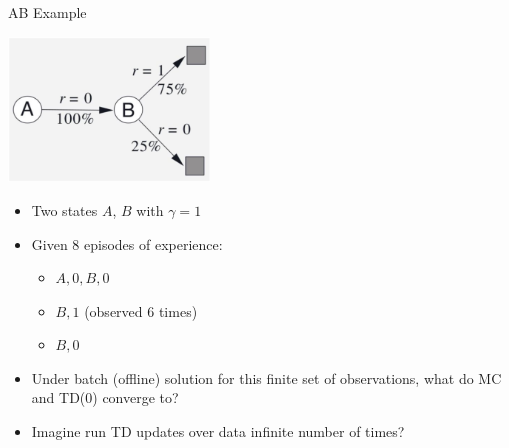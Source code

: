 \documentclass[aspectratio=169]{../latex_main/tntbeamer}  %
\begin{document}
\begin{frame}[c]{AB Example }
	
	\centering
	\includegraphics[width=0.4\textwidth]{images/ab_example.png}
	
	\begin{itemize}
		\item Two states $A$, $B$ with $\gamma = 1$
		\item Given $8$ episodes of experience:
		\begin{itemize}
			\item $A, 0, B, 0$
			\item $B, 1$ (observed $6$ times)
			\item $B, 0$ 
		\end{itemize}
		\item Under batch (offline) solution for this finite set of observations, what do MC and TD(0) converge to?
		\item Imagine run TD updates over data infinite number of times?
	\end{itemize}
	
\end{frame}
\end{document}
